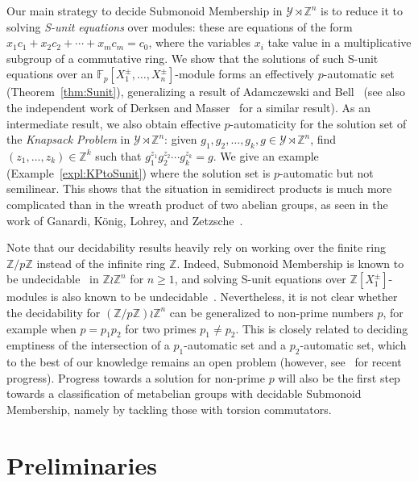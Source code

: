 \documentclass[a4paper,UKenglish,cleveref, autoref, thm-restate]{lipics-v2021}
\newcommand{\Z}{\mathbb{Z}}
\newcommand{\F}{\mathbb{F}}
\theoremstyle{definition}
\theoremstyle{definition}
\theoremstyle{definition}
\begin{document}
Our main strategy to decide Submonoid Membership in $\mathcal{Y} \rtimes \Z^n$ is to reduce it to solving \emph{S-unit equations} over modules: these are equations of the form $x_1 c_1 + x_2 c_2 + \cdots + x_m c_m = c_0$, where the variables $x_i$ take value in a multiplicative subgroup of a commutative ring.
We show that the solutions of such S-unit equations over an $\F_p[X_1^{\pm}, \ldots, X_n^{\pm}]$-module forms an effectively $p$-automatic set (Theorem~\ref{thm:Sunit}), generalizing a result of Adamczewski and Bell~\cite{adamczewski2012vanishing} (see also the independent work of Derksen and Masser~\cite{derksen2012linear} for a similar result).
As an intermediate result, we also obtain effective $p$-automaticity for the solution set of the \emph{Knapsack Problem} in $\mathcal{Y} \rtimes \Z^n$: given $g_1, g_2, \ldots, g_k, g \in \mathcal{Y} \rtimes \Z^n$, find $(z_1, \ldots, z_k) \in \Z^k$ such that $g_1^{z_1} g_2^{z_2} \cdots g_k^{z_k} = g$.
We give an example (Example~\ref{expl:KPtoSunit}) where the solution set is $p$-automatic but not semilinear.
This shows that the situation in semidirect products is much more complicated than in the wreath product of two abelian groups, as seen in the work of Ganardi, K\"{o}nig, Lohrey, and Zetzsche~\cite{DBLP:conf/stacs/GanardiKLZ18}.

Note that our decidability results heavily rely on working over the finite ring $\Z/p\Z$ instead of the infinite ring $\Z$.
Indeed, Submonoid Membership is known to be undecidable~\cite{lohrey2015rational} in $\Z \wr \Z^n$ for $n \geq 1$, and solving S-unit equations over $\Z[X_1^{\pm}]$-modules is also known to be undecidable~\cite{dong2024linear}.
Nevertheless, it is not clear whether the decidability for $(\Z/p\Z) \wr \Z^n$ can be generalized to non-prime numbers $p$, for example when $p = p_1 p_2$ for two primes $p_1 \neq p_2$. This is closely related to deciding emptiness of the intersection of a $p_1$-automatic set and a $p_2$-automatic set, which to the best of our knowledge remains an open problem (however, see~\cite{Hieronymi2022, karimov2024decidability} for recent progress).
Progress towards a solution for non-prime $p$ will also be the first step towards a classification of metabelian groups with decidable Submonoid Membership, namely by tackling those with torsion commutators.

\section{Preliminaries}
\end{document}

